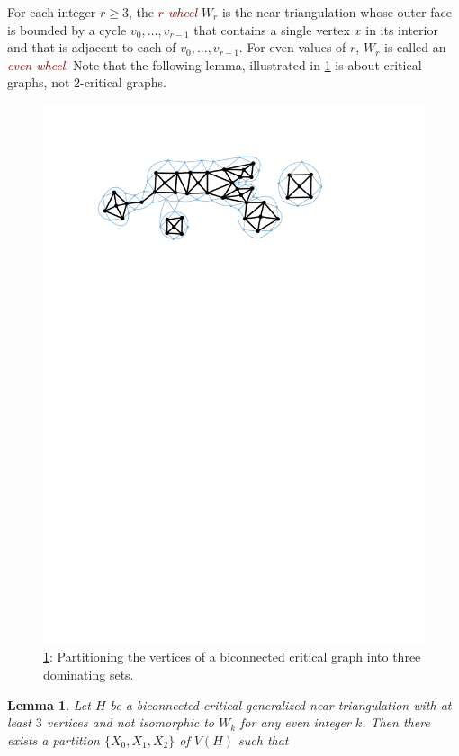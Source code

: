 \documentclass[a4paper,UKenglish,cleveref, autoref, thm-restate]{lipics-v2021}
\newtheorem{lem}{Lemma}
\newcommand{\defin}[1]{\emph{\textcolor{Maroon}{#1}}}
\begin{document}
For each integer $r\ge 3$, the \defin{$r$-wheel} $W_r$ is the near-triangulation whose outer face is bounded by a cycle $v_0,\ldots,v_{r-1}$ that contains a single vertex $x$ in its interior and that is adjacent to each of $v_0,\ldots,v_{r-1}$.  For even values of $r$, $W_r$ is called an \defin{even wheel}. Note that the following lemma, illustrated in \cref{biconnected_critical_colouring} is about critical graphs, not $2$-critical graphs.

\begin{figure}
  \centering
  \includegraphics[page=7,trim={0 55 0 10},clip]{figs/two_critical}
  \caption{\cref{biconnected_critical}: Partitioning the vertices of a biconnected critical graph into three dominating sets.}
  \label{biconnected_critical_colouring}
\end{figure}

\begin{lem}\label{biconnected_critical}
  Let $H$ be a biconnected critical generalized near-triangulation with at least $3$ vertices and not isomorphic to $W_k$ for any even integer $k$.  Then there exists a partition $\{X_0,X_1,X_2\}$ of $V(H)$ such that
\end{lem}
\end{document}
